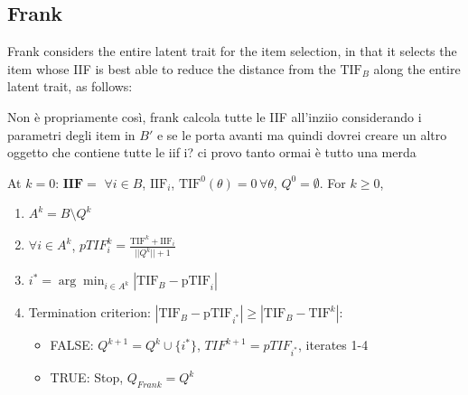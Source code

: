 \documentclass{svproc}
\begin{document}
\subsection{Frank}



Frank considers the entire latent trait for the item selection, in that it selects the item whose IIF is best able to reduce the distance from the $\text{TIF}_B$ along the entire latent trait, as follows:

\color{red}
Non è propriamente così, frank calcola tutte le IIF all'inziio considerando i parametri degli item in $B'$ e se le porta avanti ma quindi dovrei creare un altro oggetto che contiene tutte le iif i? ci provo tanto ormai è tutto una merda 
\normalcolor

At $k = 0$: $\mathbf{IIF} = $ $\forall i \in B$, $\text{IIF}_i$, $\text{TIF}^0(\theta) = 0 \, \forall \theta$, $Q^0 = \emptyset$. For $k \geq 0$,

\begin{enumerate}
	\item  $A^k = B \setminus Q^k$ 
		\color{red}
	\item $\forall i \in A^k$, $pTIF_{i}^k = \frac{\text{TIF}^k + \text{IIF}_{i}}{||Q^k||+1}$
	\normalcolor
	\item $i^* = \arg \min_{i \in A^k} |\text{TIF}_B - \text{pTIF}_i|$
	\item Termination criterion: $|\text{TIF}_B - \text{pTIF}_{i^*}| \geq |\text{TIF}_B - \text{TIF}^{k}|$: 
	\begin{itemize}
		\item FALSE:  $Q^{k+1} = Q^{k} \cup \{i^*\}$, $TIF^{k+1} = pTIF_{i^*}$, iterates 1-4 
		\item TRUE: Stop, %
		$Q_{Frank} = Q^k$
		
	\end{itemize}
\end{enumerate}
\end{document}
